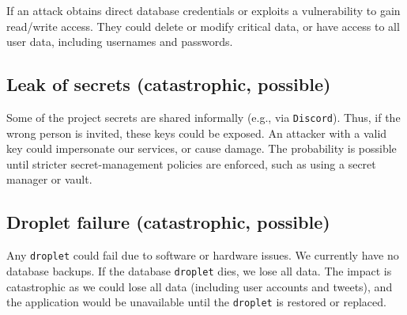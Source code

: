 If an attack obtains direct database credentials or exploits a 
vulnerability to gain read/write access. They could delete or modify 
critical data, or have access to all user data, including usernames 
and passwords.

\subsection{Leak of secrets (catastrophic, possible)}

Some of the project secrets are shared informally (e.g., via \texttt{Discord}). 
Thus, if the wrong person is invited, these keys could be exposed. 
An attacker with a valid key could impersonate our services, 
or cause damage. The probability is possible until stricter 
secret-management policies are enforced, 
such as using a secret manager or vault.

\subsection{Droplet failure (catastrophic, possible)}
Any \texttt{droplet} could fail due to software or hardware issues. We currently have 
no database backups. If the database \texttt{droplet} dies, we lose all data. 
The impact is catastrophic as we could lose all data (including user accounts 
and tweets), and the application would be unavailable until the \texttt{droplet} is 
restored or replaced.